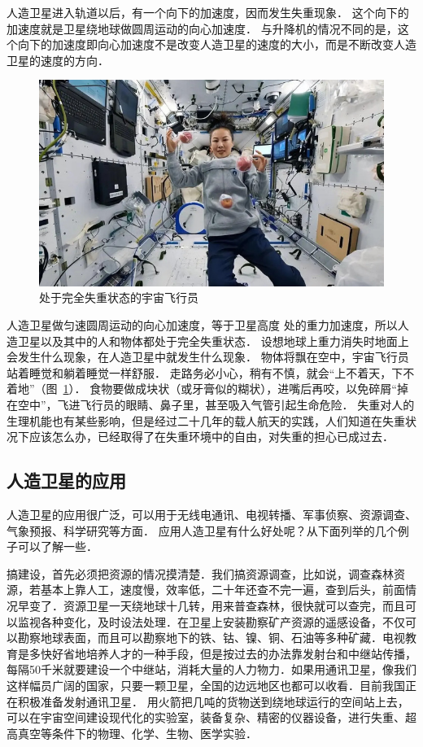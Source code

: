 人造卫星进入轨道以后，有一个向下的加速度，因而发生失重现象．
这个向下的加速度就是卫星绕地球做圆周运动的向心加速度．
与升降机的情况不同的是，这个向下的加速度即向心加速度不是改变人造卫星的速度的大小，而是不断改变人造卫星的速度的方向．

\begin{figure}[htbp]
	\centering
	\includegraphics{fig/A/5-7.jpg}
	\caption{处于完全失重状态的宇宙飞行员}\label{fig_A_5-7}
\end{figure}

人造卫星做匀速圆周运动的向心加速度，等于卫星高度
处的重力加速度，所以人造卫星以及其中的人和物体都处于完全失重状态．
设想地球上重力消失时地面上会发生什么现象，在人造卫星中就发生什么现象．
物体将飘在空中，宇宙飞行员站着睡觉和躺着睡觉一样舒服．
走路务必小心，稍有不慎，就会“上不着天，下不着地”（图~\ref{fig_A_5-7}）．
食物要做成块状（或牙膏似的糊状），进嘴后再咬，以免碎屑“掉在空中”，飞进飞行员的眼睛、鼻子里，甚至吸入气管引起生命危险．
失重对人的生理机能也有某些影响，但是经过二十几年的载人航天的实践，人们知道在失重状况下应该怎么办，已经取得了在失重环境中的自由，对失重的担心已成过去．

\subsection{人造卫星的应用}

人造卫星的应用很广泛，可以用于无线电通讯、电视转播、军事侦察、资源调查、气象预报、科学研究等方面．
应用人造卫星有什么好处呢？从下面列举的几个例子可以了解一些．

搞建设，首先必须把资源的情况摸清楚．我们搞资源调查，比如说，调查森林资源，若基本上靠人工，速度慢，效率低，二十年还查不完一遍，查到后头，前面情况早变了．资源卫星一天绕地球十几转，用来普查森林，很快就可以查完，而且可
以监视各种变化，及时设法处理．在卫星上安装勘察矿产资源的遥感设备，不仅可以勘察地球表面，而且可以勘察地下的铁、钴、镍、铜、石油等多种矿藏．电视教育是多快好省地培养人才的一种手段，但是按过去的办法靠发射台和中继站传播，每隔50千米就要建设一个中继站，消耗大量的人力物力．如果用通讯卫星，像我们这样幅员广阔的国家，只要一颗卫星，全国的边远地区也都可以收看．目前我国正在积极准备发射通讯卫星．
用火箭把几吨的货物送到绕地球运行的空间站上去，可以在宇宙空间建设现代化的实验室，装备复杂、精密的仪器设备，进行失重、超高真空等条件下的物理、化学、生物、医学实验．

